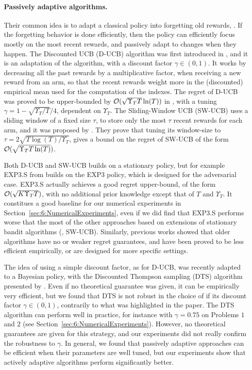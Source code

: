 \paragraph{Passively adaptive algorithms.}
%
Their common idea is to adapt a classical policy into forgetting old rewards, .
If the forgetting behavior is done efficiently, then the policy can efficiently focus mostly on the most recent rewards, and passively adapt to changes when they happen.
%
The Discounted UCB (D-UCB) algorithm was first introduced in \cite{Kocsis06}, and it is an adaptation of the \UCB{} algorithm, with a discount factor $\gamma\in(0,1)$. It works by decreasing all the past rewards by a multiplicative factor, when receiving a new reward from an arm, so that the recent rewards weight more in the (discounted) empirical mean used for the computation of the \UCB{} indexes.
The regret of D-UCB was proved to be upper-bounded by $\mathcal{O}(\sqrt{\Upsilon_T T }\ln(T))$ in \cite{Garivier11UCBDiscount}, with a tuning $\gamma = 1 - \sqrt{\Upsilon_T/T}/4$, dependent on $\Upsilon_T$.
%
The Sliding-Window UCB (SW-UCB) uses a sliding window of a fixed size $\tau$, to store only the most $\tau$ recent rewards for each arm,
and it was proposed by \cite{Garivier11UCBDiscount}.
They prove that tuning its window-size to $\tau = 2 \sqrt{T\log(T)/\Upsilon_T}$, gives a bound on the regret of SW-UCB of the form $\mathcal{O}(\sqrt{\Upsilon_T T \ln(T)})$.

Both D-UCB and SW-UCB builds on a stationary policy, but for example EXP3.S from \cite{Auer02NonStochastic}
builds on the EXP3 policy, which is designed for the adversarial case.
EXP3.S actually achieves a good regret upper-bound, of the form $\mathcal{O}(\sqrt{K \Upsilon_T T})$, with no additional prior knowledge except that of $T$ and $\Upsilon_T$.
It constitues a good baseline for our numerical experiments in Section~\ref{sec:6:NumericalExperiments},
even if we did find that EXP3.S performs worse that the most of the other approaches based on extensions of stationary bandit algorithms (\eg, SW-UCB).
Similarly, previous works showed that older algorithms have no or weaker regret guarantees, and have been proved to be less efficient empirically, or are designed for more specific settings.


The idea of using a simple discount factor, as for D-UCB, was recently adapted to a Bayesian policy, with the Discounted Thompson sampling (DTS) algorithm presented by \cite{RajKalyani17}.
Even if no theoretical guarantee was given, it can be empirically very efficient, but we found that DTS is not robust in the choice of if its discount factor $\gamma\in(0,1)$, contrarily to what was highlighted in the paper.
The DTS algorithm can perform well in practice, for instance with $\gamma=0.75$ on Problems $1$ and $2$ (see Section~\ref{sec:6:NumericalExperiments}). However, no theoretical guarantees are given for this strategy, and our experiments did not really confirm the robustness to $\gamma$.
%
In general, we found that passively adaptive approaches can be efficient when their parameters are well tuned, but our experiments show that actively adaptive algorithms perform significantly better.


